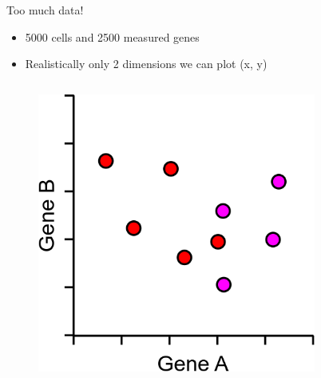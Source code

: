 \begin{frame}[allowframebreaks]{Too much data!}
    \begin{itemize}
        \item 5000 cells and 2500 measured genes
        \item Realistically only 2 dimensions we can plot (x, y)
    \end{itemize}
\begin{columns}
    \begin{column}{0.33\textwidth}
       \begin{figure}
            \centering
            \includegraphics[width=1\textwidth,keepaspectratio]{images/dul/gene-AB.png}
        \end{figure}
    \end{column}
    \begin{column}{0.33\textwidth}
        \begin{figure}
            \centering

\end{figure}
\end{column}
\end{columns}
\end{frame}

